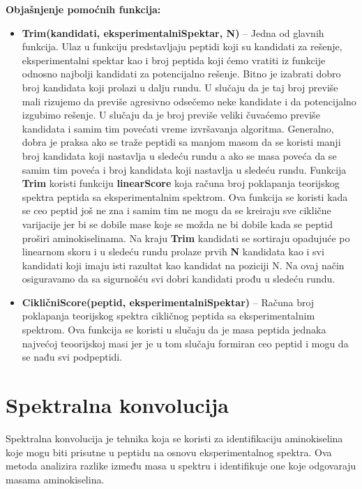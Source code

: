 \documentclass[12pt,oneside]{memoir}
\begin{document}
\noindent
\textbf{Objašnjenje pomoćnih funkcija:}
\begin{itemize}
    \item \textbf{Trim(kandidati, eksperimentalniSpektar, N)} – Jedna od glavnih funkcija. Ulaz u funkciju predstavljaju peptidi koji su kandidati za rešenje, eksperimentalni spektar kao i broj peptida koji ćemo vratiti iz funkcije odnosno najbolji kandidati za potencijalno rešenje. Bitno je izabrati dobro broj kandidata koji prolazi u dalju rundu. U slučaju da je taj broj previše mali rizujemo da previše agresivno odsečemo neke kandidate i da potencijalno izgubimo rešenje. U slučaju da je broj previše veliki čuvaćemo previše kandidata i samim tim povećati vreme izvršavanja algoritma. Generalno, dobra je praksa ako se traže peptidi sa manjom masom da se koristi manji broj kandidata koji nastavlja u sledeću rundu a ako se masa poveća da se samim tim poveća i broj kandidata koji nastavlja u sledeću rundu. Funkcija \textbf{Trim} koristi funkciju \textbf{linearScore} koja računa broj poklapanja teorijskog spektra peptida sa eksperimentalnim spektrom. Ova funkcija se koristi kada se ceo peptid još ne zna i samim tim ne mogu da se kreiraju sve ciklične varijacije jer bi se dobile mase koje se možda ne bi dobile kada se peptid proširi aminokiselinama. Na kraju \textbf{Trim} kandidati se sortiraju opadujuće po linearnom skoru i u sledeću rundu prolaze prvih \textbf{N} kandidata kao i svi kandidati koji imaju isti razultat kao kandidat na poziciji N. Na ovaj način osiguravamo da sa sigurnošću svi dobri kandidati prođu u sledeću rundu.
    \item \textbf{CikličniScore(peptid, eksperimentalniSpektar)} – Računa broj poklapanja teorijskog spektra cikličnog peptida sa eksperimentalnim spektrom. Ova funkcija se koristi u slučaju da je masa peptida jednaka najvećoj teoorijskoj masi jer je u tom slučaju formiran ceo peptid i mogu da se nađu svi podpeptidi.
\end{itemize}

\section{Spektralna konvolucija}

Spektralna konvolucija \cite{online_lecture, online_book} je tehnika koja se koristi za identifikaciju aminokiselina koje mogu biti prisutne u peptidu na osnovu eksperimentalnog spektra. Ova metoda analizira razlike između masa u spektru i identifikuje one koje odgovaraju masama aminokiselina.
\end{document}
